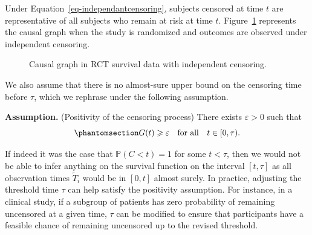 \documentclass[
  11pt,
  a4paper,
]{article}
\theoremstyle{plain}
\theoremstyle{plain}
\theoremstyle{plain}
\theoremstyle{definition}
\theoremstyle{remark}
\begin{document}
Under Equation~\ref{eq-independantcensoring}, subjects censored at time
\(t\) are representative of all subjects who remain at risk at time
\(t\). Figure~\ref{fig-RCT_ind_causalgraph} represents the causal graph
when the study is randomized and outcomes are observed under independent
censoring.

\begin{figure}


\caption{\label{fig-RCT_ind_causalgraph}Causal graph in RCT survival
data with independent censoring.}

\end{figure}%

We also assume that there is no almost-sure upper bound on the censoring
time before \(\tau\), which we rephrase under the following assumption.

\textbf{Assumption.} (Positivity of the censoring process) There exists
\(\varepsilon> 0\) such that
\begin{equation}\phantomsection\label{eq-poscen}{ 
G(t) \geqslant\varepsilon\quad \text{for all} \quad t \in [0,\tau).
}\end{equation}

If indeed it was the case that \(\mathbb{P}(C < t) = 1\) for some
\(t < \tau\), then we would not be able to infer anything on the
survival function on the interval \([t,\tau]\) as all observation times
\(\widetilde T_i\) would be in \([0,t]\) almost surely. In practice,
adjusting the threshold time \(\tau\) can help satisfy the positivity
assumption. For instance, in a clinical study, if a subgroup of patients
has zero probability of remaining uncensored at a given time, \(\tau\)
can be modified to ensure that participants have a feasible chance of
remaining uncensored up to the revised threshold.
\end{document}
